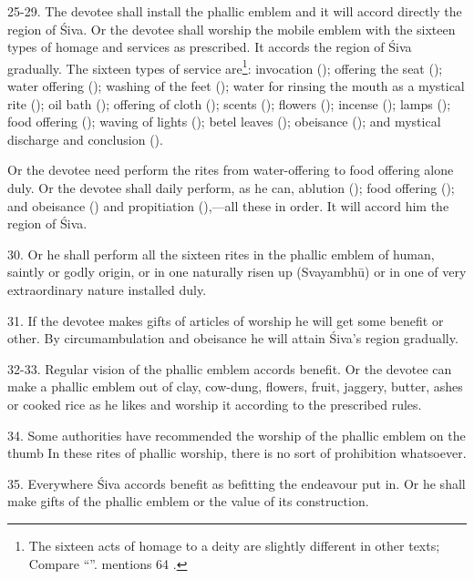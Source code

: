 25-29. The devotee shall install the phallic emblem and it will accord directly
the region of Śiva. Or the devotee shall worship the mobile emblem with
the sixteen types of homage and services as prescribed. It accords the region of
Śiva gradually. The sixteen types of service are\footnote{The sixteen acts of
homage to a deity are slightly different in other texts; Compare “”.  mentions 64
.}: invocation (); offering the seat ();
water offering (); washing of the feet (); water for
rinsing the mouth as a mystical rite (); oil bath (); offering of cloth (); scents (); flowers
(); incense (); lamps (); food offering
(); waving of lights (); betel leaves ();
obeisance (); and mystical discharge and conclusion
().

Or the devotee need perform the rites from water-offering to food offering alone
duly. Or the devotee shall daily perform, as he can, ablution ();
food offering (); and obeisance () and propitiation
(),—all these in order. It will accord him the region of Śiva.

30. Or he shall perform all the sixteen rites in the phallic emblem of human,
saintly or godly origin, or in one naturally risen up (Svayambhū) or in one of
very extraordinary nature installed duly.

31. If the devotee makes gifts of articles of worship he will get some benefit
or other. By circumambulation and obeisance he will attain Śiva’s region
gradually.

32-33. Regular vision of the phallic emblem accords benefit. Or the devotee can
make a phallic emblem out of clay, cow-dung, flowers,  fruit,
jaggery, butter, ashes or cooked rice as he likes and worship it according to
the prescribed rules.

34. Some authorities have recommended the worship of the phallic emblem on
the thumb \etc In these rites of phallic worship, there is no sort of
prohibition whatsoever.

35. Everywhere Śiva accords benefit as befitting the endeavour put in. Or he
shall make gifts of the phallic emblem or the value of its construction.

